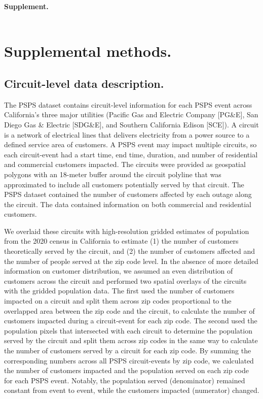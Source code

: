 \documentclass[../main.tex]{subfiles}
\begin{document}
% 

\textbf{Supplement.}
\\
\\

\pagebreak
\section{Supplemental methods.}
\subsection{Circuit-level data description.}
The PSPS dataset contains circuit-level information for each PSPS event across California's three major utilities (Pacific Gas and Electric Company [PG\&E], San Diego Gas \& Electric [SDG\&E], and Southern California Edison [SCE]). A circuit is a network of electrical lines that delivers electricity from a power source to a defined service area of customers. A PSPS event may impact multiple circuits, so each circuit-event had a start time, end time, duration, and number of residential and commercial customers impacted. The circuits were provided as geospatial polygons with an 18-meter buffer around the circuit polyline that was approximated to include all customers potentially served by that circuit. The PSPS dataset contained the number of customers affected by each outage along the circuit. The data contained information on both commercial and residential customers. 

We overlaid these circuits with high-resolution gridded estimates of population from the 2020 census in California to estimate (1) the number of customers theoretically served by the circuit, and (2) the number of customers affected and the number of people served at the zip code level. In the absence of more detailed information on customer distribution, we assumed an even distribution of customers across the circuit and performed two spatial overlays of the circuits with the gridded population data. The first used the number of customers impacted on a circuit and split them across zip codes proportional to the overlapped area between the zip code and the circuit, to calculate the number of customers impacted during a circuit-event for each zip code. The second used the population pixels that intersected with each circuit to determine the population served by the circuit and split them across zip codes in the same way to calculate the number of customers served by a circuit for each zip code. By summing the corresponding numbers across all PSPS circuit-events by zip code, we calculated the number of customers impacted and the population served on each zip code for each PSPS event. Notably, the population served (denominator) remained constant from event to event, while the customers impacted (numerator) changed.
\end{document}
